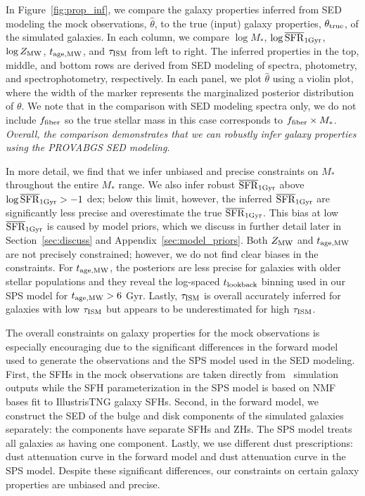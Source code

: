 In Figure~\ref{fig:prop_inf}, we compare the galaxy properties inferred from
SED modeling the mock observations, $\hat{\theta}$, to the true (input) galaxy
properties, $\theta_{\rm true}$, of the simulated galaxies.
In each column, we compare $\log M_*$, $\log \overline{\rm SFR}_{\rm 1Gyr}$, $\log Z_{\rm MW}$,
$t_{\rm age, MW}$, and $\tau_{\rm ISM}$ from left to right.  
The inferred properties in the top, middle, and bottom rows are derived from
SED modeling of spectra, photometry, and spectrophotometry, respectively.
In each panel, we plot $\hat{\theta}$ using a violin plot, where the width
of the marker represents the marginalized posterior distribution of $\theta$. 
We note that in the comparison with SED modeling spectra only, we do not
include $f_{\rm fiber}$ so the true stellar mass in this case corresponds to
$f_{\rm fiber} \times M_*$. 
\emph{Overall, the comparison demonstrates that we can robustly infer galaxy
properties using the {\sc PROVABGS} SED modeling}. 

In more detail, we find that we infer unbiased and precise constraints on
$M_*$ throughout the entire $M_*$ range. 
We also infer robust $\overline{\rm SFR}_{\rm 1Gyr}$ above $\log \overline{\rm SFR}_{\rm 1Gyr} > -1$ dex; below this limit,
however, the inferred $\overline{\rm SFR}_{\rm 1Gyr}$ are significantly less precise and
overestimate the true $\overline{\rm SFR}_{\rm 1Gyr}$. 
This bias at low $\overline{\rm SFR}_{\rm 1Gyr}$ is caused by model priors, which we discuss in
further detail later in Section~\ref{sec:discuss} and
Appendix~\ref{sec:model_priors}. 
Both $Z_{\rm MW}$ and $t_{\rm age, MW}$ are not precisely constrained; however, we do not
find clear biases in the constraints. 
For $t_{\rm age, MW}$, the posteriors are less precise for galaxies with older stellar
populations and they reveal the log-spaced $t_{\rm lookback}$ binning used in our
SPS model for $t_{\rm age, MW} > 6$ Gyr.
Lastly, $\tau_{\rm ISM}$ is overall accurately inferred for galaxies with low
$\tau_{\rm ISM}$ but appears to be underestimated for high $\tau_{\rm ISM}$.

The overall constraints on galaxy properties for the mock observations is
especially encouraging due to the significant differences in the forward
model used to generate the observations and the SPS model used in the SED
modeling. 
First, the SFHs in the mock observations are taken directly from \lgal~simulation
outputs while the SFH parameterization in the SPS model is based on NMF bases fit
to IllustrisTNG galaxy SFHs.
Second, in the forward model, we construct the SED of the bulge and disk
components of the simulated galaxies separately: the components have separate
SFHs and ZHs. 
The SPS model treats all galaxies as having one component. 
Lastly, we use different dust prescriptions: \cite{mathis1983} dust attenuation  
curve in the forward model and \cite{kriek2013} dust attenuation curve in the
SPS model. 
Despite these significant differences, our constraints on certain galaxy
properties are unbiased and precise. 

